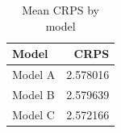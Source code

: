 \begin{table}[ht]
\centering
\begin{tabular}{lr}
\hline
Model & CRPS \\
\hline
Model A & 2.578016 \\
Model B & 2.579639 \\
Model C & 2.572166 \\
\hline
\end{tabular}
\caption{Mean CRPS by model}
\label{tab:mean_crps_fertility}
\end{table}
